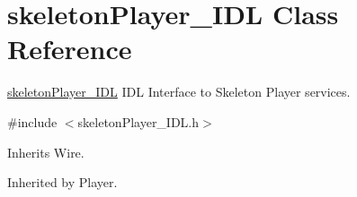 \section{skeleton\+Player\+\_\+\+I\+DL Class Reference}
\label{classskeletonPlayer__IDL}


\hyperlink{classskeletonPlayer__IDL}{skeleton\+Player\+\_\+\+I\+DL} I\+DL Interface to Skeleton Player services.  




{\ttfamily \#include $<$skeleton\+Player\+\_\+\+I\+D\+L.\+h$>$}



Inherits Wire.



Inherited by Player.


